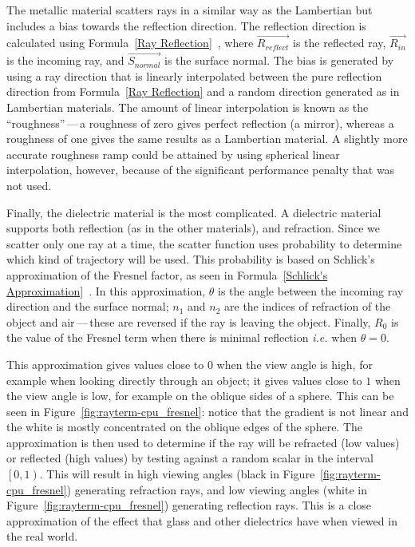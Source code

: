 The metallic material scatters rays in a similar way as the Lambertian but includes a bias towards the reflection direction.
The reflection direction is calculated using Formula~\ref{Ray Reflection}~\cite{prunier2017shading}, where $\vec{R_{reflect}}$ is the reflected ray, $\vec{R_{in}}$ is the incoming ray, and $\vec{S_{normal}}$ is the surface normal.
The bias is generated by using a ray direction that is linearly interpolated between the pure reflection direction from Formula~\ref{Ray Reflection} and a random direction generated as in Lambertian materials.
The amount of linear interpolation is known as the ``roughness''\,---\,a roughness of zero gives perfect reflection (a mirror), whereas a roughness of one gives the same results as a Lambertian material.
A slightly more accurate roughness ramp could be attained by using spherical linear interpolation, however, because of the significant performance penalty that was not used.

Finally, the dielectric material is the most complicated.
A dielectric material supports both reflection (as in the other materials), and refraction.
Since we scatter only one ray at a time, the scatter function uses probability to determine which kind of trajectory will be used.
This probability is based on Schlick's approximation of the Fresnel factor, as seen in Formula~\ref{Schlick's Approximation}~\cite{schlick1994inexpensive, learnopengltheory, prunier2017shading}.
In this approximation, $\theta$ is the angle between the incoming ray direction and the surface normal; $n_1$ and $n_2$ are the indices of refraction of the object and air\,---\,these are reversed if the ray is leaving the object.
Finally, $R_0$ is the value of the Fresnel term when there is minimal reflection \textit{i.e.} when $\theta = 0$.



This approximation gives values close to $0$ when the view angle is high, for example when looking directly through an object; it gives values close to $1$ when the view angle is low, for example on the oblique sides of a sphere.
This can be seen in Figure~\ref{fig:rayterm-cpu_fresnel}: notice that the gradient is not linear and the white is mostly concentrated on the oblique edges of the sphere.
The approximation is then used to determine if the ray will be refracted (low values) or reflected (high values) by testing against a random scalar in the interval $\left[0, 1\right)$.
This will result in high viewing angles (black in Figure~\ref{fig:rayterm-cpu_fresnel}) generating refraction rays, and low viewing angles (white in Figure~\ref{fig:rayterm-cpu_fresnel}) generating reflection rays.
This is a close approximation of the effect that glass and other dielectrics have when viewed in the real world.

